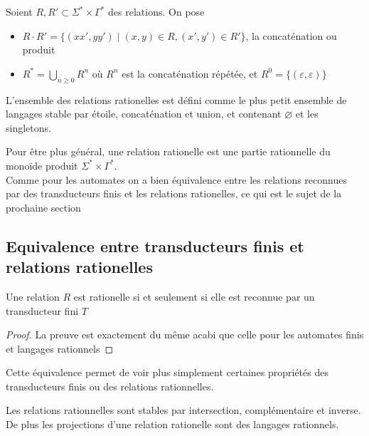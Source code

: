 \documentclass{scrartcl}
\begin{document}
\begin{flushleft}
\begin{define}
    Soient $R, R' \subset \Sigma^* \times \Gamma^*$ des relations. On pose
    \begin{itemize}
        \item $R \cdot R' = \{ (xx', yy') \mid (x, y) \in R, (x', y') \in R' \}$, la concaténation ou produit
        \item $\displaystyle R^* = \bigcup_{n \geq 0} R^n$ où $R^n$ est la concaténation répétée, et $R^0 =
        \{ (\varepsilon, \varepsilon) \}$
    \end{itemize}
\end{define}

\begin{define}
    L'ensemble des relations rationelles est défini comme le plus petit ensemble de langages stable par étoile,
    concaténation et union, et contenant $\varnothing$ et les singletons.
\end{define}

Pour être plus général, une relation rationelle est une partie rationnelle du monoïde produit
$\Sigma^* \times \Gamma^*$.\\
Comme pour les automates on a bien équivalence entre les relations reconnues par des transducteurs finis
et les relations rationelles, ce qui est le sujet de la prochaine section

\subsection{Equivalence entre transducteurs finis et relations rationelles}

\begin{theorem}
    Une relation $R$ est rationelle si et seulement si elle est reconnue par un transducteur fini $T$
\end{theorem}

\begin{proof}
    La preuve est exactement du même acabi que celle pour les automates finis et langages rationnels
\end{proof}

Cette équivalence permet de voir plus simplement certaines propriétés des transducteurs finis ou des relations
rationnelles.
\begin{prop}
    Les relations rationnelles sont stables par intersection, complémentaire et inverse. De plus les projections d'une relation
    rationelle sont des langages rationnels.
\end{prop}


\end{flushleft}
\end{document}
